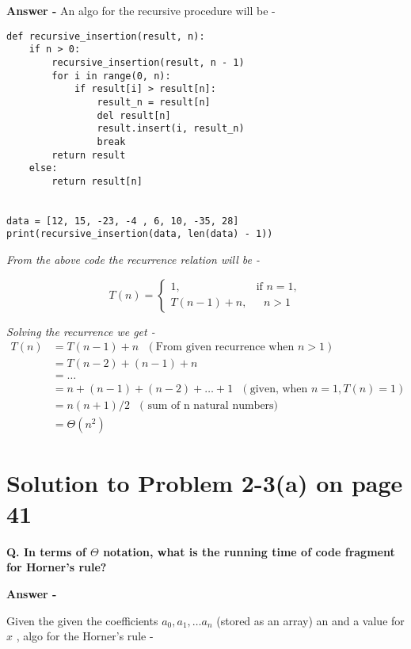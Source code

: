 \documentclass[5pt]{article}
\begin{document}
\setlength{\parskip}{1.2em}
\setlength{\parindent}{0em}

\textbf{Answer -}
An algo for the recursive procedure will be - 
\begin{lstlisting}
def recursive_insertion(result, n):
    if n > 0:
        recursive_insertion(result, n - 1)
        for i in range(0, n):
            if result[i] > result[n]:
                result_n = result[n]
                del result[n]
                result.insert(i, result_n)
                break
        return result
    else:
        return result[n]


data = [12, 15, -23, -4 , 6, 10, -35, 28]
print(recursive_insertion(data, len(data) - 1))
\end{lstlisting}
 \emph{From the above code  the recurrence relation will be -}
 
 \begin{equation*}
  T(n) =\begin{cases}
    1, & \text{if $n = 1$},\\
    T(n - 1) + n, & \text{ $n > 1$}
  \end{cases}
\end{equation*}

\emph{Solving the recurrence we get \cite{insertionalgo} -}
\begin{align*}
T(n) & = T(n-1) + n ~~~  (\text{From given recurrence when $n > 1$})\\
& = T(n-2) + (n-1) + n \\
& = \dots \\
& = n + (n-1) + (n-2) + \dots + 1 ~~~ (\text{given, when $n = 1 , T(n) = 1 $})\\
& = n(n+1) / 2  ~~~~ \text{( sum of n natural numbers)}\\
& = \Theta(n^2)
\end{align*}

 
 

\section{Solution to Problem 2-3(a) on page 41}
\textbf{Q. In terms of  $\Theta$ notation, what is the running time of  code fragment for Horner's rule?}

\setlength{\parskip}{1.2em}
\setlength{\parindent}{0em}

\textbf{Answer -}

Given the given the coefficients $a_0, a_1, \dots a_n $ (stored as an array) an and a value for $x$ , algo for the Horner's rule \cite{horneralgo} -
 
\end{document}
